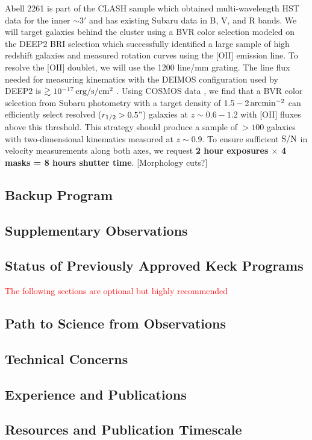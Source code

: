 \documentclass[12pt]{article}
\begin{document}
Abell 2261 is part of the CLASH sample \citep{Postman2012} which obtained multi-wavelength HST data for the inner $\sim3'$ and has existing Subaru data in B, V, and R bands. We will target galaxies behind the cluster using a BVR color selection modeled on the DEEP2 BRI selection \citep{Newman2013} which successfully identified a large sample of high redshift galaxies and measured rotation curves using the [OII] emission line. To resolve the [OII] doublet, we will use the 1200 line/mm grating. The line flux needed for measuring kinematics with the DEIMOS configuration used by DEEP2 is $\gtrsim10^{-17}\,{\rm erg/s/cm^2}$ \citep{Kassin2012}. Using COSMOS data \citep{Jouvel2009}, we find that a BVR color selection from Subaru photometry with a target density of $1.5-2\,{\rm arcmin^{-2}}$ can efficiently select resolved ($r_{1/2}>0.5"$) galaxies at $z\sim0.6-1.2$ with [OII] fluxes above this threshold. This strategy should produce a sample of $>100$ galaxies with two-dimensional kinematics measured at $z\sim0.9$. To ensure sufficient ${\rm S/N}$ in velocity measurements along both axes, we request \textbf{2 hour exposures $\times$ 4 masks = 8 hours shutter time}. [Morphology cuts?]


\subsection{Backup Program}

\subsection{Supplementary Observations}

\subsection{Status of Previously Approved Keck Programs}



\textcolor{Red}{The following sections are optional but highly recommended}
\subsection{Path to Science from Observations}

\subsection{Technical Concerns}

\subsection{Experience and Publications}

\subsection{Resources and Publication Timescale}



\end{document}

